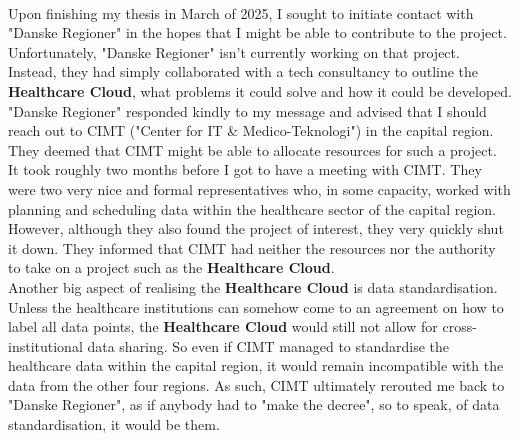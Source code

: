 \\
Upon finishing my thesis in March of 2025, I sought to initiate contact with "Danske Regioner" in the hopes that I might be able to contribute to the project. Unfortunately, "Danske Regioner" isn't currently working on that project. Instead, they had simply collaborated with a tech consultancy to outline the \textbf{Healthcare Cloud}, what problems it could solve and how it could be developed. "Danske Regioner" responded kindly to my message and advised that I should reach out to CIMT ("Center for IT \& Medico-Teknologi") in the capital region. They deemed that CIMT might be able to allocate resources for such a project.
\\
It took roughly two months before I got to have a meeting with CIMT. They were two very nice and formal representatives who, in some capacity, worked with planning and scheduling data within the healthcare sector of the capital region. However, although they also found the project of interest, they very quickly shut it down. They informed that CIMT had neither the resources nor the authority to take on a project such as the \textbf{Healthcare Cloud}.
\\
Another big aspect of realising the \textbf{Healthcare Cloud} is data standardisation. Unless the healthcare institutions can somehow come to an agreement on how to label all data points, the \textbf{Healthcare Cloud} would still not allow for cross-institutional data sharing. So even if CIMT managed to standardise the healthcare data within the capital region, it would remain incompatible with the data from the other four regions. As such, CIMT ultimately rerouted me back to "Danske Regioner", as if anybody had to "make the decree", so to speak, of data standardisation, it would be them.

